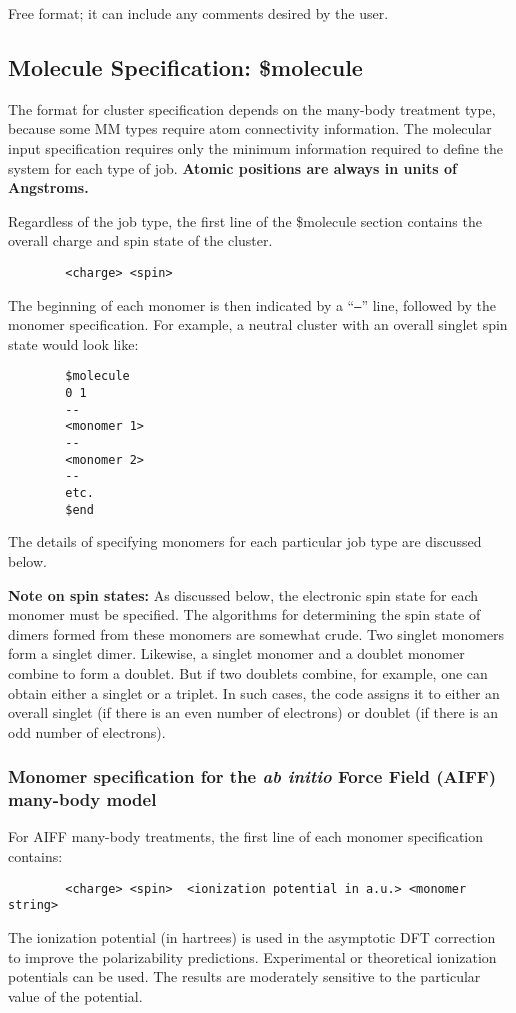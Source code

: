 \documentclass[11pt,letterpaper]{article}
\begin{document}
\begin{spacing}{1.0}
	Free format; it can include any comments desired by the user.

\subsection{Molecule Specification: \$molecule}

The format for cluster specification depends on the many-body
treatment type, because some MM types require atom connectivity
information.  The molecular input specification requires only the
minimum information required to define the system for each
type of job.  {\bf Atomic positions are always in units of Angstroms.}

Regardless of the job type, the first line of the \$molecule section
contains the overall charge and spin state of the cluster.
\begin{verbatim}
        <charge> <spin>
\end{verbatim}
The beginning of each monomer is then indicated by a ``{\tt--}'' line,
followed by the monomer specification.  For example, a neutral cluster
with an overall singlet spin state would look like:

\begin{verbatim}
        $molecule
        0 1
        --
        <monomer 1>
        --
        <monomer 2>
        --
        etc.
        $end
\end{verbatim}
\noindent The details of specifying monomers for each particular job
type are discussed below.  

{\bf Note on spin states:} As discussed below, the electronic spin
state for each monomer must be specified.  The algorithms for
determining the spin state of dimers formed from these monomers are
somewhat crude.  Two singlet monomers form a singlet dimer.  Likewise,
a singlet monomer and a doublet monomer combine to form a doublet.
But if two doublets combine, for example, one can obtain either a
singlet or a triplet.  In such cases, the code assigns it to either an
overall singlet (if there is an even number of electrons) or doublet
(if there is an odd number of electrons).

 
\subsubsection{Monomer specification for the {\em ab initio} Force Field (AIFF) many-body model}

For AIFF many-body treatments, the first line of each monomer
specification contains:
\begin{verbatim}
        <charge> <spin>  <ionization potential in a.u.> <monomer string>
\end{verbatim}
The ionization potential (in hartrees) is used in the asymptotic DFT
correction to improve the polarizability predictions.  Experimental or
theoretical ionization potentials can be used.  The results are
moderately sensitive to the particular value of the potential.


\end{spacing}
\end{document}
